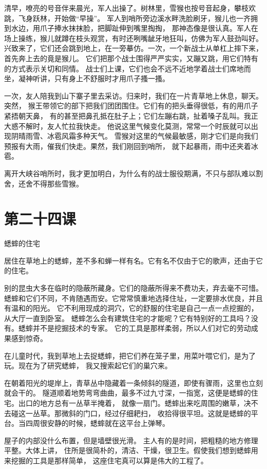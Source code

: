 \documentclass[12pt,UTF8]{ctexbook}
\begin{document}
清早，嘹亮的号音伴来晨光，军人出操了。树林里，雪猴也按号音起身，攀枝欢跳，飞身跃林，开始做“早操”。
军人到哨所旁边溪水畔洗脸刷牙，猴儿也一齐拥到水边，用爪子捧水抹抹脸，把脚趾伸到嘴里掏掏，
那神态像是很认真。军人在场上操练，猴儿就蹲在枝头观赏，有时还咧嘴龇牙地狂叫，仿佛为军人鼓劲叫好。
兴致来了，它们还会跳到地上，在一旁摹仿。一次，一个新战士从单杠上摔下来，首先奔上去的竟是猴儿。
它们把那个战士围得严严实实，又蹦又跳，用它们特有的方式表示关切和同情。
战士们上课，它们也会不远不近地学着战士们席地而坐，凝神听讲，只有身上不舒服时才用爪子搔一搔。

一次，友人陪我到山下寨子里去采访。归来时，我们在一片青草地上休息，聊天。突然，
猴王带领它的部下把我们团团围住。它们有的把头垂得很低，有的用爪子紧捂朝天鼻，
有的甚至把鼻孔抵在肚子上；它们左蹦右跳，扯着嗓子乱叫。我正大惑不解时，友人忙拉我快走。
他说这里气候变化莫测，常常一个时辰就可以出现阴晴雨雪、冰雹风霜多种天气。
雪猴对这里的气候最敏感，刚才它们是向我们预报有大雨，催我们快走。果然，我们刚回到哨所，
就下起暴雨，雨中还夹着冰雹。

离开大峡谷哨所时，我才更加明白，为什么有的战士服役期满，不只与部队难以割舍，还舍不得那些雪猴。

\section{第二十四课}

蟋蟀的住宅

居住在草地上的蟋蟀，差不多和蝉一样有名。它有名不仅由于它的歌声，还由于它的住宅。

别的昆虫大多在临时的隐蔽所藏身。它们的隐蔽所得来不费功夫，弃去毫不可惜。
蟋蟀和它们不同，不肯随遇而安。它常常慎重地选择住址，一定要排水优良，并且有温和的阳光。
它不利用现成的洞穴，它的舒服的住宅是自己一点一点挖掘的，从大厅一直到卧室。
蟋蟀怎么会有建筑住宅的才能呢？它有特别好的工具吗？没有。蟋蟀并不是挖掘技术的专家。
它的工具是那样柔弱，所以人们对它的劳动成果感到惊奇。

在儿童时代，我到草地上去捉蟋蟀，把它们养在笼子里，用菜叶喂它们，是为了玩。现在为了研究蟋蟀，
我又搜索起它们的巢穴来。

在朝着阳光的堤岸上，青草丛中隐藏着一条倾斜的隧道，即使有骤雨，这里也立刻就会干的。
隧道顺着地势弯弯曲曲，最多不过九寸深，一指宽，这便是蟋蟀的住宅。出口的地方总有一丛草半掩着，
就像一扇门。蟋蟀出来吃周围的嫩草，决不去碰这一丛草。那微斜的门口，经过仔细耙扫，
收拾得很平坦。这就是蟋蟀的平台。当四周很安静的时候，蟋蟀就在这平台上弹琴。

屋子的内部没什么布置，但是墙壁很光滑。 主人有的是时间，把粗糙的地方修理平整。大体上讲，
住所是很简朴的，清洁、干燥，很卫生。假使我们想到蟋蟀用来挖掘的工具是那样简单，
这座住宅真可以算是伟大的工程了。
\end{document}
